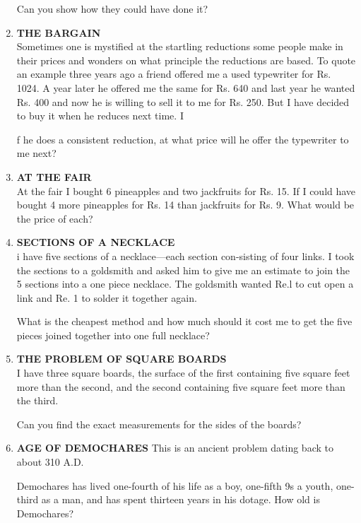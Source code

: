 \documentclass[12pt]{article}
\begin{document}
\begin{enumerate}
Can you show  how  they  could  have  done  it? 


\item \textbf{THE  BARGAIN} \\
Sometimes  one  is mystified  at the startling  reductions some  people  make  in their  prices  and  wonders  on what principle  the reductions  are based.  To  quote  an example three  years  ago a friend  offered  me a used  typewriter  for Rs. 1024.  A  year  later  he offered  me the  same  for Rs. 640  and last year  he wanted  Rs.  400  and  now  he is willing  to sell  it to me  for Rs.  250.  But  I have decided  to buy it when  he reduces  next  time. I

f he does  a consistent  reduction,  at what  price  will he offer  the typewriter  to me next? 


\item \textbf{AT  THE  FAIR} \\
At the  fair  I bought  6 pineapples  and  two  jackfruits for Rs. 15. If I could  have  bought  4 more  pineapples for Rs. 14 than  jackfruits  for Rs.  9. What  would  be the price  of each? 


\item \textbf{SECTIONS  OF A NECKLACE} \\
i have  five  sections  of a necklace—each  section  con-sisting  of four  links.  I took  the sections  to a goldsmith and asked  him  to give  me an estimate  to join  the  5 sections  into  a one piece  necklace.  The  goldsmith  wanted Re.l to  cut  open  a link  and Re. 1 to solder  it together again. 

What  is the cheapest  method  and  how  much  should  it cost me to get the five pieces  joined  together  into  one full necklace? 


\item \textbf{THE  PROBLEM  OF  SQUARE  BOARDS} \\
I have  three  square  boards,  the  surface  of the  first containing  five square  feet  more  than  the second,  and  the second  containing  five square  feet more  than  the third.

Can you find  the exact  measurements  for the sides  of the boards?


\item \textbf{AGE  OF DEMOCHARES}
This is an  ancient  problem  dating  back  to about 310 A.D. 

Demochares  has lived  one-fourth  of his life  as a boy, one-fifth  9s a youth,  one-third  as a man,  and  has  spent thirteen  years  in his dotage.  How  old is Demochares? 



\end{enumerate}
\end{document}

